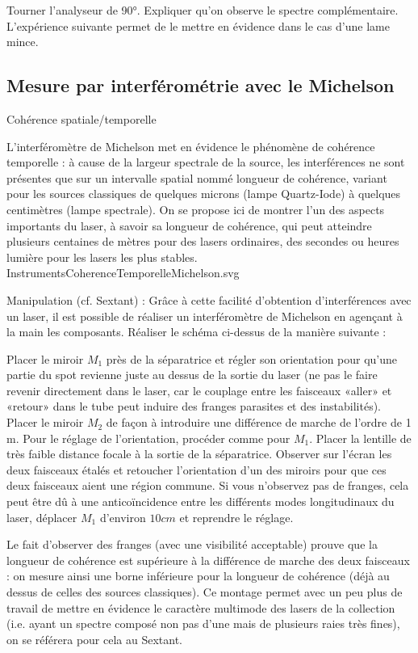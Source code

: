 \documentclass{article}%
\begin{document}
    Tourner l'analyseur de 90°. Expliquer qu'on observe le spectre complémentaire. L'expérience suivante permet de le mettre en évidence dans le cas d'une lame mince.
\subsection{Mesure par interférométrie avec le Michelson}
Cohérence spatiale/temporelle

L'interféromètre de Michelson met en évidence le phénomène de cohérence temporelle : à cause de la largeur spectrale de la source, les interférences ne sont présentes que sur un intervalle spatial nommé longueur de cohérence, variant pour les sources classiques de quelques microns (lampe Quartz-Iode) à quelques centimètres (lampe spectrale). On se propose ici de montrer l'un des aspects importants du laser, à savoir sa longueur de cohérence, qui peut atteindre plusieurs centaines de mètres pour des lasers ordinaires, des secondes ou heures lumière pour les lasers les plus stables.
InstrumentsCoherenceTemporelleMichelson.svg

Manipulation (cf. Sextant) : Grâce à cette facilité d'obtention d'interférences avec un laser, il est possible de réaliser un interféromètre de Michelson en agençant à la main les composants. Réaliser le schéma ci-dessus de la manière suivante :

    Placer le miroir $M_{1}$ près de la séparatrice et régler son orientation pour qu'une partie du spot revienne juste au dessus de la sortie du laser (ne pas le faire revenir directement dans le laser, car le couplage entre les faisceaux «aller» et «retour» dans le tube peut induire des franges parasites et des instabilités).
    Placer le miroir $M_{2}$ de façon à introduire une différence de marche de l'ordre de 1 m. Pour le réglage de l'orientation, procéder comme pour $M_{1}$.
    Placer la lentille de très faible distance focale à la sortie de la séparatrice. Observer sur l'écran les deux faisceaux étalés et retoucher l'orientation d'un des miroirs pour que ces deux faisceaux aient une région commune. Si vous n'observez pas de franges, cela peut être dû à une anticoïncidence entre les différents modes longitudinaux du laser, déplacer $M_{1}$ d'environ $10 cm$ et reprendre le réglage.

Le fait d'observer des franges (avec une visibilité acceptable) prouve que la longueur de cohérence est supérieure à la différence de marche des deux faisceaux : on mesure ainsi une borne inférieure pour la longueur de cohérence (déjà au dessus de celles des sources classiques). Ce montage permet avec un peu plus de travail de mettre en évidence le caractère multimode des lasers de la collection (i.e. ayant un spectre composé non pas d'une mais de plusieurs raies très fines), on se référera pour cela au Sextant. 
\end{document}
